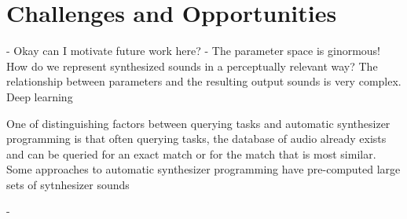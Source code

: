 


\section{Challenges and Opportunities}
- Okay can I motivate future work here?
- The parameter space is ginormous! How do we represent synthesized sounds in a perceptually relevant way? The relationship between parameters and the resulting output sounds is very complex. Deep learning 

One of distinguishing factors between querying tasks and automatic synthesizer programming is that often querying tasks, the database of audio already exists and can be queried for an exact match or for the match that is most similar. Some approaches to automatic synthesizer programming have pre-computed large sets of sytnhesizer sounds 

- 
